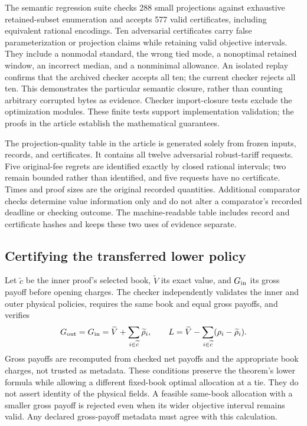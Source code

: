 \documentclass[11pt,letterpaper]{article}
\theoremstyle{definition}\newtheorem{remark}[theorem]{Remark}
\begin{document}
The semantic regression suite checks 288 small projections against exhaustive retained-subset enumeration and accepts 577 valid certificates, including equivalent rational encodings. Ten adversarial certificates carry false parameterization or projection claims while retaining valid objective intervals. They include a nonmodal standard, the wrong tied mode, a nonoptimal retained window, an incorrect median, and a nonminimal allowance. An isolated replay confirms that the archived checker accepts all ten; the current checker rejects all ten. This demonstrates the particular semantic closure, rather than counting arbitrary corrupted bytes as evidence. Checker import-closure tests exclude the optimization modules. These finite tests support implementation validation; the proofs in the article establish the mathematical guarantees.

The projection-quality table in the article is generated solely from frozen inputs, records, and certificates. It contains all twelve adversarial robust-tariff requests. Five original-fee regrets are identified exactly by closed rational intervals; two remain bounded rather than identified, and five requests have no certificate. Times and proof sizes are the original recorded quantities. Additional comparator checks determine value information only and do not alter a comparator's recorded deadline or checking outcome. The machine-readable table includes record and certificate hashes and keeps these two uses of evidence separate.

\subsection{Certifying the transferred lower policy}\label{sec:transfer65}
Let $\widetilde c$ be the inner proof's selected book, $\widetilde V$ its exact value, and $G_{\rm in}$ its gross payoff before opening charges. The checker independently validates the inner and outer physical policies, requires the same book and equal gross payoffs, and verifies
\[
 G_{\rm out}=G_{\rm in}=\widetilde V+\sum_{i\in\widetilde c}\widetilde\rho_i,
 \qquad L=\widetilde V-\sum_{i\in\widetilde c}(\rho_i-\widetilde\rho_i).
\]
Gross payoffs are recomputed from checked net payoffs and the appropriate book charges, not trusted as metadata. These conditions preserve the theorem's lower formula while allowing a different fixed-book optimal allocation at a tie. They do not assert identity of the physical fields. A feasible same-book allocation with a smaller gross payoff is rejected even when its wider objective interval remains valid. Any declared gross-payoff metadata must agree with this calculation.
\end{document}
